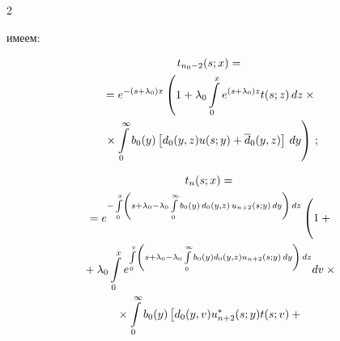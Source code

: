 \begin{multicols}{2}


имеем:





\noindent


\begin{multline}


\label{5-4-1-m}


t_{n_0-2}(s;x)= {}\\


{}=e^{-(s + \lambda_0) x}\left(


1+ \lambda_0 \int\limits_0^x e^{(s + \lambda_0) z} t(s;z)\, dz\times{}\right.\\


\left.{}\times


\int\limits_0^\infty b_0(y) \left[d_0(y,z) u(s;y) + \d_0(y,z)\right] \, dy


\right)\,;


\end{multline}







\vspace*{-12pt}





\noindent


\begin{multline}


\label{5-4-2-m}


t_n(s;x)={}\\


{}= e^{-\int\limits_0^x \left( s + \lambda_0 -


\lambda_0 \int\limits_0^\infty b_0(y)\, d_0(y,z)\, u_{n+2}(s;y) \, dy


\right)\,dz} 


\left( \vphantom{\int\limits_0^\infty}


1 +{}\right.\\


{}+ \lambda_0 \int\limits_0^x e^{\int\limits_0^v \left(


s + \lambda_0 - \lambda_0 \int\limits_0^\infty b_0(y) d_0(y,z) u_{n+2}(s;y) \, dy


\right)\,dz} dv \times{}


\\


{}\times


\int\limits_0^\infty b_0(y) \left[d_0(y,v) u_{n+2}^*(s;y) t(s;v)+{}\right.\\



\end{multline}
\end{multicols}
